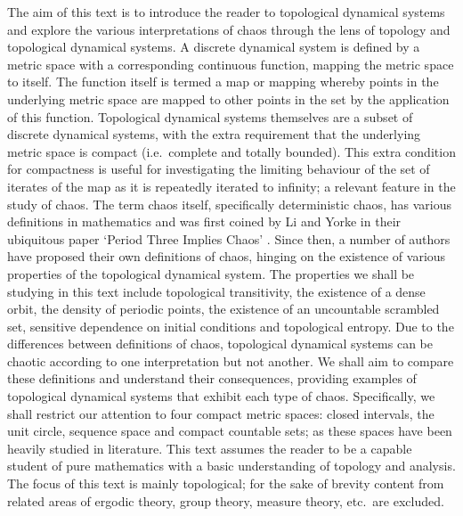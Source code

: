 The aim of this text is to introduce the reader to topological dynamical systems and explore the various interpretations of chaos through the lens of topology and topological dynamical systems. A discrete dynamical system is defined by a metric space with a corresponding continuous function, mapping the metric space to itself. The function itself is termed a map or mapping whereby points in the underlying metric space are mapped to other points in the set by the application of this function. Topological dynamical systems themselves are a subset of discrete dynamical systems, with the extra requirement that the underlying metric space is compact (i.e.\ complete and totally bounded). This extra condition for compactness is useful for investigating the limiting behaviour of the set of iterates of the map as it is repeatedly iterated to infinity; a relevant feature in the study of chaos. The term chaos itself, specifically deterministic chaos, has various definitions in mathematics and was first coined by Li and Yorke in their ubiquitous paper `Period Three Implies Chaos' \cite{li-yorke}. Since then, a number of authors have proposed their own definitions of chaos, hinging on the existence of various properties of the topological dynamical system. The properties we shall be studying in this text include topological transitivity, the existence of a dense orbit, the density of periodic points, the existence of an uncountable scrambled set, sensitive dependence on initial conditions and topological entropy. Due to the differences between definitions of chaos, topological dynamical systems can be chaotic according to one interpretation but not another. We shall aim to compare these definitions and understand their consequences, providing examples of topological dynamical systems that exhibit each type of chaos. Specifically, we shall restrict our attention to four compact metric spaces: closed intervals, the unit circle, sequence space and compact countable sets; as these spaces have been heavily studied in literature. This text assumes the reader to be a capable student of pure mathematics with a basic understanding of topology and analysis. The focus of this text is mainly topological; for the sake of brevity content from related areas of ergodic theory, group theory, measure theory, etc.\ are excluded.

